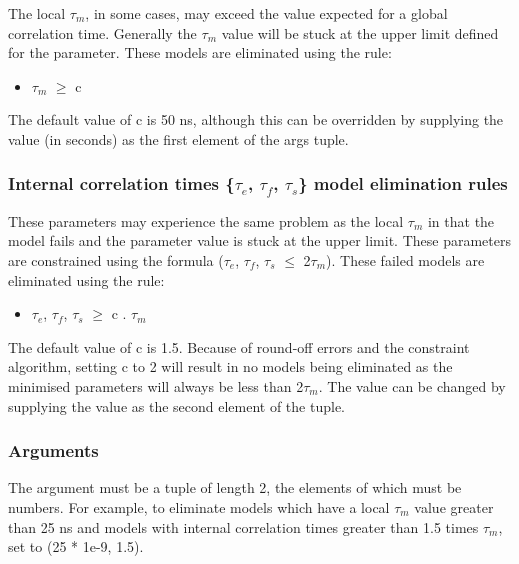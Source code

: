 The local $\tau_m$, in some cases, may exceed the value expected for a global correlation time. Generally the $\tau_m$ value will be stuck at the upper limit defined for the parameter.  These models are eliminated using the rule:


\begin{itemize}
\item[] $\tau_m$ $\ge$ c 
\end{itemize}


The default value of c is 50 ns, although this can be overridden by supplying the value (in seconds) as the first element of the args tuple.



\subsubsection{Internal correlation times \{$\tau_e$, $\tau_f$, $\tau_s$\} model elimination rules}

These parameters may experience the same problem as the local $\tau_m$ in that the model fails and the parameter value is stuck at the upper limit.  These parameters are constrained using the formula ($\tau_e$, $\tau_f$, $\tau_s$ $\le$ 2$\tau_m$).  These failed models are eliminated using the rule:


\begin{itemize}
\item[] $\tau_e$, $\tau_f$, $\tau_s$ $\ge$ c . $\tau_m$ 
\end{itemize}


The default value of c is 1.5.  Because of round-off errors and the constraint algorithm, setting c to 2 will result in no models being eliminated as the minimised parameters will always be less than 2$\tau_m$.  The value can be changed by supplying the value as the second element of the tuple.



\subsubsection{Arguments}

The  argument must be a tuple of length 2, the elements of which must be numbers.  For example, to eliminate models which have a local $\tau_m$ value greater than 25 ns and models with internal correlation times greater than 1.5 times $\tau_m$, set  to (25 * 1e-9, 1.5).




